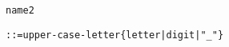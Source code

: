 \begin{alltt}
\hypertarget{name2P\newLinkVer}{name2} ::= upper-case-letter \verb"{"letter | digit | "_"\verb"}"
\end{alltt}
